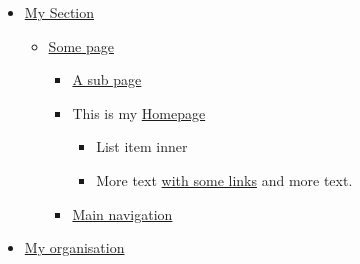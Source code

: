 \documentclass[11pt,a4paper]{article}
\begin{document}
\begin{itemize}
\item \href{\#}{My Section}
  \begin{itemize}
\item \href{/start.html}{Some page}
    \begin{itemize}
\item \href{/home2.html}{A sub page}
\item This is my \href{/home.html}{Homepage}
      \begin{itemize}
\item List item inner
\item More text \href{/some\_links.html}{with some links} and more text.
      \end{itemize}
\item \href{\#main-navigation}{Main navigation}
    \end{itemize}
  \end{itemize}
\item \href{\#}{My organisation}
\end{itemize}
\end{document}
